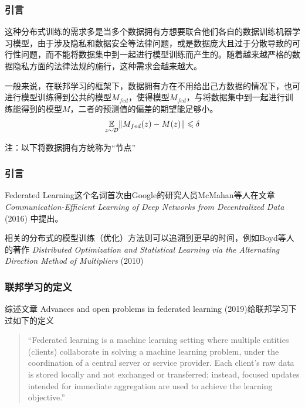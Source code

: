 \begin{frame}
\frametitle{引言}

这种分布式训练的需求多是当多个数据拥有方想要联合他们各自的数据训练机器学习模型，由于涉及隐私和数据安全等法律问题，或是数据庞大且过于分散导致的可行性问题，而不能将数据集中到一起进行模型训练而产生的。随着越来越严格的数据隐私方面的法律法规的施行，这种需求会越来越大。

\pause
\vspace{0.8em}

一般来说，在联邦学习的框架下，数据拥有方在不用给出己方数据的情况下，也可进行模型训练得到公共的模型$M_{fed}$，使得模型$M_{fed}$，与将数据集中到一起进行训练能得到的模型$M$，二者的预测值的偏差的期望能足够小。
$$\operatorname*{\mathbb{E}}_{z\sim\mathcal{D}} \lVert M_{fed}(z) - M(z) \rVert \leqslant \delta$$

\vspace{0.5em}

{\footnotesize 注：以下将数据拥有方统称为``节点''}

\end{frame}


\begin{frame}
\frametitle{引言}

Federated Learning这个名词首次由Google的研究人员McMahan等人在文章\cite{mcmahan2017fed_avg} \emph{Communication-Efficient Learning of Deep Networks from Decentralized Data} (2016) 中提出。

\vspace{1em}
\pause

相关的分布式的模型训练（优化）方法则可以追溯到更早的时间，例如Boyd等人的著作\cite{boyd2011distributed} \emph{Distributed Optimization and Statistical Learning via the Alternating Direction Method of Multipliers} (2010)

\end{frame}


\begin{frame}
\frametitle{联邦学习的定义}

综述文章\cite{kairouz2019advances_fl} Advances and open problems in federated learning (2019)给联邦学习下过如下的定义

\vspace{0.8em}

\begin{quote}
    ``Federated learning is a machine learning setting where multiple entities (clients) collaborate in solving a machine learning problem, under the coordination of a central server or service provider. Each client's raw data is stored locally and not exchanged or transferred; instead, focused updates intended for immediate aggregation are used to achieve the learning objective.''
\end{quote}


\end{frame}

